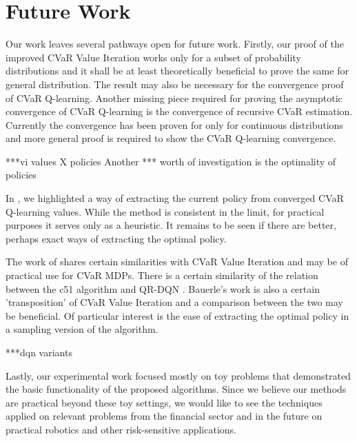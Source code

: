
\section{Future Work}

Our work leaves several pathways open for future work. Firstly, our proof of the improved CVaR Value Iteration works only for a subset of probability distributions and it shall be at least theoretically beneficial to prove the same for general distribution. The result may also be necessary for the convergence proof of CVaR Q-learning. Another missing piece required for proving the asymptotic convergence of CVaR Q-learning is the convergence of recursive CVaR estimation. Currently the convergence has been proven for only for continuous distributions and more general proof is required to show the CVaR Q-learning convergence.

***vi values X policies
Another *** worth of investigation is the optimality of policies

In , we highlighted a way of extracting the current policy from converged CVaR Q-learning values. While the method is consistent in the limit, for practical purposes it serves only as a heuristic. It remains to be seen if there are better, perhaps exact ways of extracting the optimal policy.

The work of \citet{bauerle2011markov} shares certain similarities with CVaR Value Iteration and may be of practical use for CVaR MDPs. There is a certain similarity of the relation between the c51 algorithm \cite{...} and QR-DQN \cite{...}. Bauerle's work is also a certain 'transposition' of CVaR Value Iteration and a comparison between the two may be beneficial. Of particular interest is the ease of extracting the optimal policy in a sampling version of the algorithm.

***dqn variants

Lastly, our experimental work focused mostly on toy problems that demonstrated the basic functionality of the proposed algorithms. Since we believe our methods are practical beyond these toy settings, we would like to see the techniques applied on relevant problems from the financial sector and in the future on practical robotics and other risk-sensitive applications.


